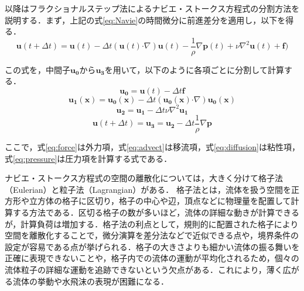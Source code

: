 \documentclass[a4j,12pt]{jreport}
\begin{document}
以降はフラクショナルステップ法によるナビエ・ストークス方程式の分割方法を説明する．まず，上記の式\ref{eq:Navie}の時間微分に前進差分を適用し，以下を得る．
\[
\bm{u} (t + \varDelta t) =   \bm{u} (t)-\varDelta t (\bm{u} (t)  \boldsymbol{\cdot}\nabla) \bm{u} (t)- \frac{1}{\rho}\nabla \bm{p}  (t)  + \nu\nabla^2\bm{u} (t)  + \bm{f}) 
\]

この式を，中間子$\bm{u_0}$から$\bm{u_3}$を用いて，以下のように各項ごとに分割して計算する．
\begin{equation}\label{eq:force}
	\bm{u_0} =  \bm{u} (t)  - \varDelta t \bm{f} 
\end{equation} 
\begin{equation}\label{eq:advect}
	\bm{u_1} (\bm{x}) = \bm{u_0} (\bm{x}) - \varDelta t (\bm{u_0}(\bm{x})  \boldsymbol{\cdot}\nabla) \bm{u_0}(\bm{x})
\end{equation}
\begin{equation}\label{eq:diffusion}
	\bm{u_2}   =  \bm{u_1} - \varDelta t \nu\nabla^2\bm{u_1}
\end{equation}
\begin{equation}\label{eq:pressure}
	\bm{u} (t + \varDelta t)= \bm{u_3}  =  \bm{u_2} - \varDelta t \frac{1}{\rho}\nabla \bm{p} 
\end{equation} 

ここで，式\ref{eq:force}は外力項，式\ref{eq:advect}は移流項，式\ref{eq:diffusion}は粘性項，式\ref{eq:pressure}は圧力項を計算する式である．



ナビエ・ストークス方程式の空間の離散化については，大きく分けて格子法（Eulerian）と粒子法（Lagrangian）がある．
格子法とは，流体を扱う空間を正方形や立方体の格子に区切り，格子の中心や辺，頂点などに物理量を配置して計算する方法である．区切る格子の数が多いほど，流体の詳細な動きが計算できるが，計算負荷は増加する．格子法の利点として，規則的に配置された格子により空間を離散化することで，微分演算を差分法などで近似できる点や，境界条件の設定が容易である点が挙げられる．格子の大きさよりも細かい流体の振る舞いを正確に表現できないことや，格子内での流体の運動が平均化されるため，個々の流体粒子の詳細な運動を追跡できないという欠点がある．これにより，薄く広がる流体の挙動や水飛沫の表現が困難になる．
\end{document}
